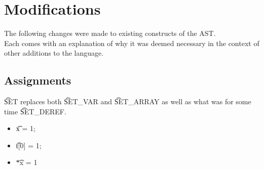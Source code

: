 \section{Modifications}
The following changes were made to existing constructs of the AST.\\
Each comes with an explanation of why it was deemed necessary in the context of other additions to the language.

\subsection{Assignments}
\t{SET} replaces both \t{SET\_VAR} and \t{SET\_ARRAY} as well as what was for some time \t{SET\_DEREF}.\\
\begin{itemize}
    \item \t{x = 1;}
    \not\to\ 
    \to\ 
    \item \t{t[0] = 1;}
    \not\to\ 
    \to\ 
    \item \t{*x = 1}
    \not\to\ 
    \to\ 
\end{itemize}
